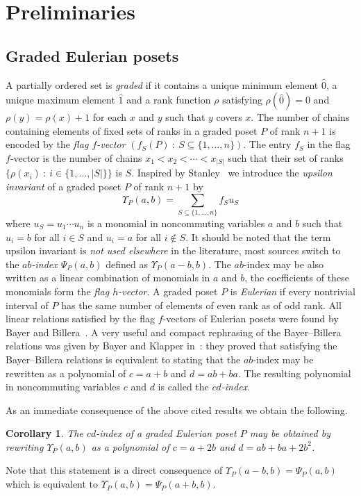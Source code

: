 \documentclass[reqno,12pt]{amsart}
\numberwithin{equation}{section}
\newtheorem{corollary}[theorem]{Corollary}
\newcommand{\0}{\widehat{0}}
\newcommand{\1}{\widehat{1}}
\newcommand{\2}{\widehat{2}}
\begin{document}
\section{Preliminaries}

\subsection{Graded Eulerian posets}

A partially ordered set is
{\em graded} if it contains a unique minimum element $\0$, a unique
maximum element $\1$ and a rank function $\rho$ satisfying $\rho(\0)=0$
and $\rho(y)=\rho(x)+1$ for each $x$ and $y$ such that $y$ covers $x$.
The number of chains containing elements of  fixed sets of ranks in 
a graded poset $P$ of rank $n+1$  is encoded by the {\em flag
  $f$-vector} $(f_S(P)\::\: S\subseteq \{1,\ldots,n\})$. The entry $f_S$
in the flag $f$-vector  is the number of chains
$x_1<x_2<\cdots<x_{|S|}$ such that their set of ranks $\{\rho(x_i)\::\:
i\in \{1,\ldots,|S|\}\}$ is $S$. Inspired by Stanley~\cite{Stanley-flag} we introduce
the {\em upsilon invariant} of a graded poset $P$ of rank $n+1$ by 
$$
\Upsilon_P(a,b)=\sum_{S\subseteq \{1,\ldots,n\}} f_S u_S
$$
where $u_S=u_1\cdots u_n$ is a monomial in noncommuting variables $a$
and $b$ such that $u_i=b$ for all $i\in S$ and $u_i=a$ for all $i\not\in
S$. It should be noted that the term upsilon invariant is {\em not used
elsewhere} in the literature, most sources switch to the {\em $ab$-index
  $\Psi_P(a,b)$} defined as $\Upsilon_P(a-b,b)$. The
$ab$-index may be also written as a linear combination of monomials in
$a$ and $b$, the coefficients of these monomials form the {\em flag $h$-vector}.
A graded poset $P$ is {\em Eulerian} if every nontrivial interval of $P$
has the same number of elements of even rank as of odd rank. All linear
relations satisfied by the flag $f$-vectors of Eulerian posets were
found by Bayer and Billera~\cite{Bayer-Billera}. A very useful and
compact rephrasing of the Bayer--Billera relations was given by Bayer and
Klapper in~\cite{Bayer-Klapper}: they proved that satisfying the
Bayer--Billera relations is equivalent to stating that the $ab$-index may
be rewritten as a polynomial of $c=a+b$ and $d=ab+ba$. The resulting
polynomial in noncommuting variables $c$ and $d$ is called the {\em
  $cd$-index}.  

As an immediate consequence of the above cited results we obtain the
following.
\begin{corollary}
The $cd$-index of a graded Eulerian poset $P$ may be obtained by
rewriting $\Upsilon_P(a,b)$ as a polynomial of $c=a+2b$ and $d=ab+ba+2b^2$.
\end{corollary}  
Note that this statement is a direct consequence of
$\Upsilon_P(a-b,b)=\Psi_P(a,b)$ which is equivalent to
$\Upsilon_P(a,b)=\Psi_P(a+b,b)$.  
\end{document}

